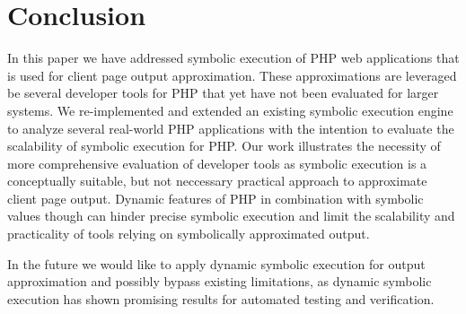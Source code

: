 \documentclass[sigconf]{acmart}
\begin{document}
\section{Conclusion}
In this paper we have addressed symbolic execution of PHP web applications that
is used for client page output approximation. These approximations are leveraged
be several developer tools for PHP that yet have not been evaluated for larger
systems. We re-implemented and extended an existing symbolic execution engine
to analyze several real-world PHP applications with the intention to evaluate
the scalability of symbolic execution for PHP. Our work illustrates the
necessity of more comprehensive evaluation of developer tools as
symbolic execution is a conceptually suitable, but not neccessary practical
approach to approximate client page output. Dynamic features of PHP in
combination with symbolic values though can hinder precise symbolic execution
and limit the scalability and practicality of tools relying on symbolically
approximated output.

In the future we would like to apply dynamic symbolic execution for output
approximation and possibly bypass existing limitations, as dynamic symbolic
execution has shown promising results for automated testing and verification.


 
\end{document}
